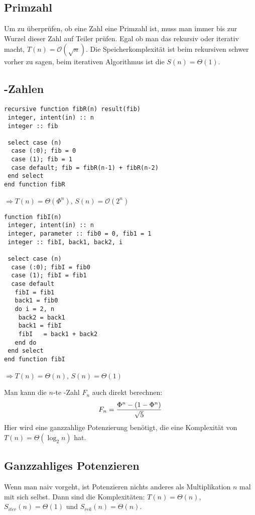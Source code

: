 \subsection{Primzahl}

Um zu überprüfen, ob eine Zahl eine Primzahl ist, muss man immer bis zur Wurzel dieser Zahl auf Teiler prüfen. Egal ob man das rekursiv oder iterativ macht, $T(n)=\mathcal{O}(\sqrt{n})$. Die Speicherkomplexität ist beim rekursiven schwer vorher zu sagen, beim iterativen Algorithmus ist die $S(n)=\Theta(1)$.

\subsection{-Zahlen}
\begin{lstlisting}
recursive function fibR(n) result(fib)
 integer, intent(in) :: n
 integer :: fib

 select case (n)
  case (:0); fib = 0
  case (1); fib = 1
  case default; fib = fibR(n-1) + fibR(n-2)
 end select
end function fibR
\end{lstlisting}
$\Rightarrow T(n) = \Theta(\Phi^n)$, $S(n)=\mathcal{O}(2^n)$

\begin{lstlisting}
function fibI(n)
 integer, intent(in) :: n
 integer, parameter :: fib0 = 0, fib1 = 1
 integer :: fibI, back1, back2, i

 select case (n)
  case (:0); fibI = fib0
  case (1); fibI = fib1
  case default
   fibI = fib1
   back1 = fib0
   do i = 2, n
    back2 = back1
    back1 = fibI
    fibI   = back1 + back2
   end do
 end select
end function fibI
\end{lstlisting}
$\Rightarrow T(n) = \Theta(n)$, $S(n)=\Theta(1)$

Man kann die $n$-te -Zahl $F_n$ auch direkt berechnen:
\begin{align}
	F_n = \frac{\Phi^n-(1-\Phi^n)}{\sqrt{5}}\notag
\end{align}
Hier wird eine ganzzahlige Potenzierung benötigt, die eine Komplexität von $T(n)=\Theta(\log_2 n)$ hat.

\subsection{Ganzzahliges Potenzieren}

Wenn man naiv vorgeht, ist Potenzieren nichts anderes als Multiplikation $n$ mal mit sich selbst. Dann sind die Komplexitäten: $T(n)=\Theta(n)$, $S_{iter}(n)=\Theta(1)$ und $S_{rek}(n)=\Theta(n)$.

